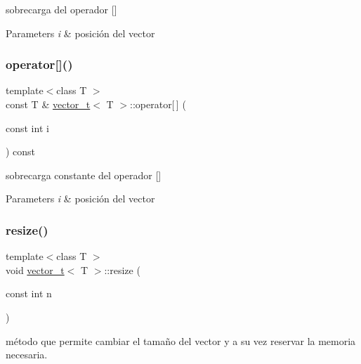 sobrecarga del operador \mbox{[}\mbox{]} 


\begin{DoxyParams}{Parameters}
{\em i} & posición del vector \\
\hline
\end{DoxyParams}
\mbox{\label{classvector__t_a44c63cecf539ce2b71cabe0d372f210f}} 
\subsubsection{\texorpdfstring{operator[]()}{operator[]()}\hspace{0.1cm}{\footnotesize\ttfamily [2/2]}}
{\footnotesize\ttfamily template$<$class T $>$ \\
const T \& \hyperlink{classvector__t}{vector\+\_\+t}$<$ T $>$\+::operator\mbox{[}$\,$\mbox{]} (\begin{DoxyParamCaption}\item[{const int}]{i }\end{DoxyParamCaption}) const}



sobrecarga constante del operador \mbox{[}\mbox{]} 


\begin{DoxyParams}{Parameters}
{\em i} & posición del vector \\
\hline
\end{DoxyParams}
\mbox{\label{classvector__t_a239516986f1c608d1836bd31c2bd5e30}} 
\subsubsection{\texorpdfstring{resize()}{resize()}}
{\footnotesize\ttfamily template$<$class T $>$ \\
void \hyperlink{classvector__t}{vector\+\_\+t}$<$ T $>$\+::resize (\begin{DoxyParamCaption}\item[{const int}]{n }\end{DoxyParamCaption})}



método que permite cambiar el tamaño del vector y a su vez reservar la memoria necesaria. 


